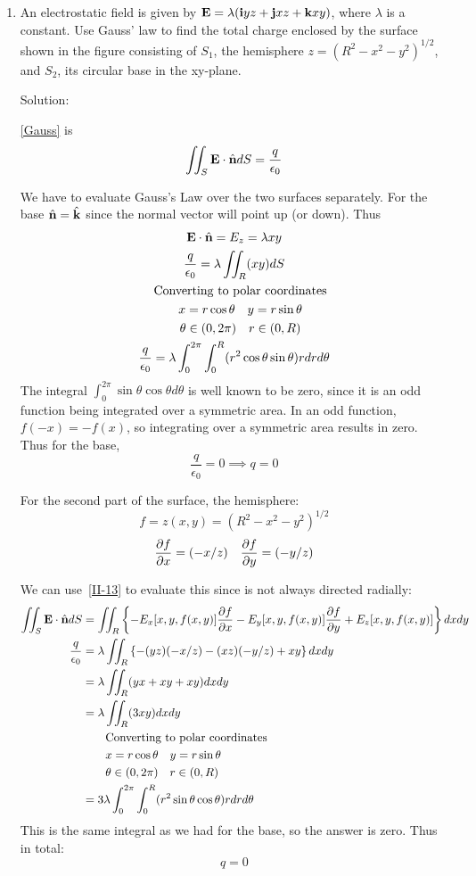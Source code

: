 \documentclass{article}
\begin{document}
\begin{enumerate}
    \item An electrostatic field is given by $ \textbf{E} = \lambda (\textbf{i}{yz} + \textbf{j}{xz} + \textbf{k}{xy})$,
    where $\lambda$ is a constant. Use Gauss' law to find the total charge enclosed by the surface
    shown in the figure consisting of $S_1$, the hemisphere $ z = (R^2 - x^2 - y^2)^{1/2} $,
    and $S_2$, its circular base in the xy-plane.

    Solution:

    \ref{Gauss} is
    \[ \iint_S \textbf{E} \cdot \hat{\textbf{n}} dS = \frac{q}{\epsilon_0} \]

    We have to evaluate Gauss's Law over the two surfaces separately. For the base
    $\hat{\textbf{n}} = \hat{\textbf{k}}$ since the normal vector will point up (or down). Thus
    \begin{gather*}
        \textbf{E} \cdot \hat{\textbf{n}} = E_z = \lambda xy \\
        \frac{q}{\epsilon_0} = \lambda \iint_R (xy) dS \\
        \quad \textnormal{Converting to polar coordinates} \\
        \quad x = r \cos \theta \quad y = r \sin \theta \\
        \quad \theta \in (0,2\pi) \quad r \in (0,R) \\
        \frac{q}{\epsilon_0} = \lambda \int_0^{2\pi}\int_0^R (r^2 \cos \theta \sin \theta) rdrd\theta \\
    \end{gather*}
    The integral $ \int_0^{2\pi} \sin \theta \cos \theta d\theta$ is well known to be zero, since it is an odd function
    being integrated over a symmetric area. In an odd function, $f(-x) = -f(x)$, so integrating over
    a symmetric area results in zero. Thus for the base,
    \[ \frac{q}{\epsilon_0} = 0 \implies q = 0\]

    For the second part of the surface, the hemisphere:
    \[ f = z(x,y) = (R^2 - x^2 - y^2)^{1/2} \]
    \[ \frac{\partial{f}}{\partial{x}} = (-x/z) \quad \frac{\partial{f}}{\partial{y}} = (-y/z) \]

    We can use~\ref{II-13} to evaluate this since  is not always directed radially:
    \begin{align*}
        \iint_S \textbf{E} \cdot \hat{\textbf{n}} dS &= \iint_R \left\{ -E_x[x,y,f(x,y)]\frac{\partial{f}}{\partial{x}} - E_y[x,y,f(x,y)]\frac{\partial{f}}{\partial{y}} + E_z[x,y,f(x,y)] \right\} dxdy \\
        \frac{q}{\epsilon_0} &= \lambda \iint_R \left\{ -(yz)(-x/z) - (xz)(-y/z) + xy \right\} dxdy \\
        &= \lambda \iint_R (yx + xy + xy) dxdy \\
        &= \lambda \iint_R (3xy) dxdy \\
        & \qquad \textnormal{Converting to polar coordinates} \\
        & \qquad x = r \cos \theta \quad y = r \sin \theta \\
        & \qquad \theta \in (0,2\pi) \quad r \in (0,R) \\
        &= 3\lambda \int_0^{2\pi}\int_0^R (r^2 \sin \theta \cos \theta) rdrd\theta \\
    \end{align*}
    This is the same integral as we had for the base, so the answer is zero. Thus in total:
    \[ q = 0 \]


\end{enumerate}
\end{document}
